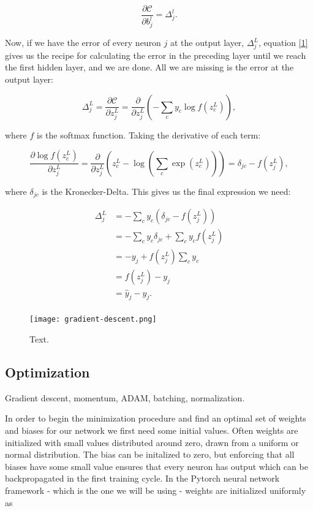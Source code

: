 $$ \frac{\partial \mathcal{C}}{\partial b_{j}^l} = \Delta_j^l .$$

Now, if we have the error of every neuron $j$ at the output layer, $\Delta_j^L$, equation \ref{1} 
gives us the recipe for calculating the error in the preceding layer until we reach the first hidden layer, 
and we are done. All we are missing is the error at the output layer:

$$ \Delta_j^L = \frac{\partial \mathcal{C}}{\partial z_j^L} = \frac{\partial}{\partial z_j^L} \left( - \sum_c y_{c} \log f(z_{c}^L) \right) ,$$

where $f$ is the softmax function.
Taking the derivative of each term:

$$ \frac{\partial \log f(z_c^L)}{\partial z_j^L} = \frac{\partial}{\partial z_j^L} \left( z_c^L - \log \left( \sum_c \exp
\left( z_c^L \right) \right) \right) = \delta_{jc} - f(z_j^L) ,$$

where $\delta_{jc}$ is the Kronecker-Delta.
This gives us the final expression we need:

\begin{equation}
\begin{split}
\Delta_j^L &= -\sum_c y_c \left( \delta_{jc} - f(z_j^L) \right) \\
           &= -\sum_c y_c \delta_{jc} + \sum_c y_c f(z_j^L) \\
           &= -y_j + f(z_j^L) \sum_c y_c \\
           &= f(z_j^L) - y_j \\
           &= \hat{y}_j - y_j . \\
\end{split}
\end{equation}

\begin{figure}
    \centering
    \texttt{[image: gradient-descent.png]}
    \caption{Text.}
    \label{fig:gradient-descent}
\end{figure}

\subsection{Optimization}
Gradient descent, momentum, ADAM, batching,
normalization.

In order to begin the minimization procedure and find an optimal
set of weights and biases for our network we first need some initial values.
Often weights are initialized with small values distributed around zero,
drawn from a uniform or normal distribution. The bias can be initalized to zero,
but enforcing that all biases have some small value ensures that every
neuron has output which can be backpropagated in the first training cycle.
In the Pytorch neural network framework - which is the one we will 
be using - weights are initialized uniformly as

